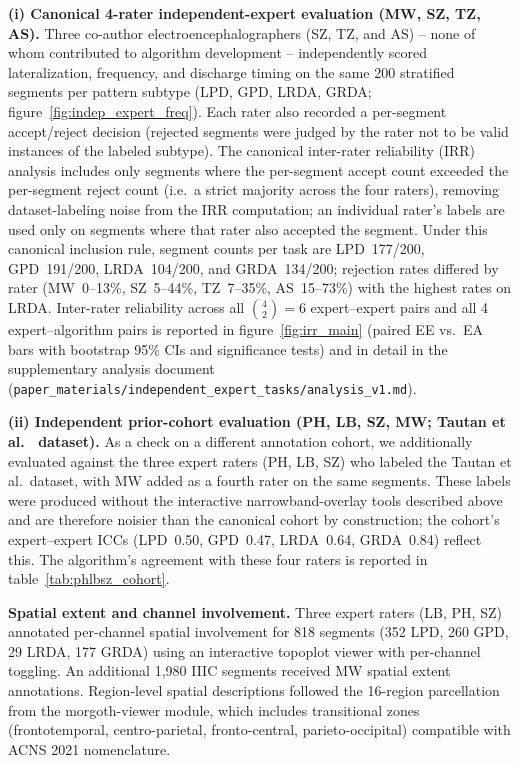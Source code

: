 \documentclass{iopjournal}
\begin{document}
\textbf{(i) Canonical 4-rater independent-expert evaluation (MW, SZ, TZ, AS).} Three co-author electroencephalographers (SZ, TZ, and AS) -- none of whom contributed to algorithm development -- independently scored lateralization, frequency, and discharge timing on the same 200 stratified segments per pattern subtype (LPD, GPD, LRDA, GRDA; figure~\ref{fig:indep_expert_freq}). Each rater also recorded a per-segment accept/reject decision (rejected segments were judged by the rater not to be valid instances of the labeled subtype). The canonical inter-rater reliability (IRR) analysis includes only segments where the per-segment accept count exceeded the per-segment reject count (i.e.\ a strict majority across the four raters), removing dataset-labeling noise from the IRR computation; an individual rater's labels are used only on segments where that rater also accepted the segment. Under this canonical inclusion rule, segment counts per task are LPD~177/200, GPD~191/200, LRDA~104/200, and GRDA~134/200; rejection rates differed by rater (MW~0--13\%, SZ~5--44\%, TZ~7--35\%, AS~15--73\%) with the highest rates on LRDA. Inter-rater reliability across all $\binom{4}{2}=6$ expert--expert pairs and all 4 expert--algorithm pairs is reported in figure~\ref{fig:irr_main} (paired EE vs.\ EA bars with bootstrap 95\% CIs and significance tests) and in detail in the supplementary analysis document (\texttt{paper\_materials/independent\_expert\_tasks/analysis\_v1.md}).

\textbf{(ii) Independent prior-cohort evaluation (PH, LB, SZ, MW; Tautan et al.~\cite{tautan2025} dataset).} As a check on a different annotation cohort, we additionally evaluated against the three expert raters (PH, LB, SZ) who labeled the Tautan et al.\ dataset, with MW added as a fourth rater on the same segments. These labels were produced without the interactive narrowband-overlay tools described above and are therefore noisier than the canonical cohort by construction; the cohort's expert--expert ICCs (LPD~0.50, GPD~0.47, LRDA~0.64, GRDA~0.84) reflect this. The algorithm's agreement with these four raters is reported in table~\ref{tab:phlbsz_cohort}.

\textbf{Spatial extent and channel involvement.} Three expert raters (LB, PH, SZ) annotated per-channel spatial involvement for 818 segments (352 LPD, 260 GPD, 29 LRDA, 177 GRDA) using an interactive topoplot viewer with per-channel toggling. An additional 1,980 IIIC segments received MW spatial extent annotations. Region-level spatial descriptions followed the 16-region parcellation from the morgoth-viewer module, which includes transitional zones (frontotemporal, centro-parietal, fronto-central, parieto-occipital) compatible with ACNS 2021 nomenclature.
\end{document}
